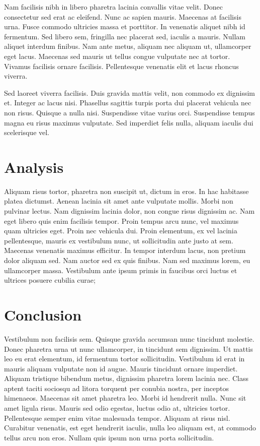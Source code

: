 \documentclass[a4paper,12pt]{article}
\begin{document}
\begin{multicols}{2}
		Nam facilisis nibh in libero pharetra lacinia convallis vitae velit. Donec consectetur sed erat ac eleifend. Nunc ac sapien mauris. Maecenas at facilisis urna. Fusce commodo ultricies massa et porttitor. In venenatis aliquet nibh id fermentum. Sed libero sem, fringilla nec placerat sed, iaculis a mauris. Nullam aliquet interdum finibus. Nam ante metus, aliquam nec aliquam ut, ullamcorper eget lacus. Maecenas sed mauris ut tellus congue vulputate nec at tortor. Vivamus facilisis ornare facilisis. Pellentesque venenatis elit et lacus rhoncus viverra.
		
		Sed laoreet viverra facilisis. Duis gravida mattis velit, non commodo ex dignissim et. Integer ac lacus nisi. Phasellus sagittis turpis porta dui placerat vehicula nec non risus. Quisque a nulla nisi. Suspendisse vitae varius orci. Suspendisse tempus magna eu risus maximus vulputate. Sed imperdiet felis nulla, aliquam iaculis dui scelerisque vel.
		
	\section{Analysis}
		Aliquam risus tortor, pharetra non suscipit ut, dictum in eros. In hac habitasse platea dictumst. Aenean lacinia sit amet ante vulputate mollis. Morbi non pulvinar lectus. Nam dignissim lacinia dolor, non congue risus dignissim ac. Nam eget libero quis enim facilisis tempor. Proin tempus arcu nunc, vel maximus quam ultricies eget. Proin nec vehicula dui. Proin elementum, ex vel lacinia pellentesque, mauris ex vestibulum nunc, ut sollicitudin ante justo at sem. Maecenas venenatis maximus efficitur. In tempor interdum lacus, non pretium dolor aliquam sed. Nam auctor sed ex quis finibus. Nam sed maximus lorem, eu ullamcorper massa. Vestibulum ante ipsum primis in faucibus orci luctus et ultrices posuere cubilia curae;	
	
	\section{Conclusion}
		Vestibulum non facilisis sem. Quisque gravida accumsan nunc tincidunt molestie. Donec pharetra urna ut nunc ullamcorper, in tincidunt sem dignissim. Ut mattis leo eu erat elementum, id fermentum tortor sollicitudin. Vestibulum id erat in mauris aliquam vulputate non id augue. Mauris tincidunt ornare imperdiet. Aliquam tristique bibendum metus, dignissim pharetra lorem lacinia nec. Class aptent taciti sociosqu ad litora torquent per conubia nostra, per inceptos himenaeos. Maecenas sit amet pharetra leo. Morbi id hendrerit nulla. Nunc sit amet ligula risus. Mauris sed odio egestas, luctus odio at, ultricies tortor. Pellentesque semper enim vitae malesuada tempor. Aliquam at risus nisl. Curabitur venenatis, est eget hendrerit iaculis, nulla leo aliquam est, at commodo tellus arcu non eros. Nullam quis ipsum non urna porta sollicitudin.
		
\end{multicols}
\end{document}
